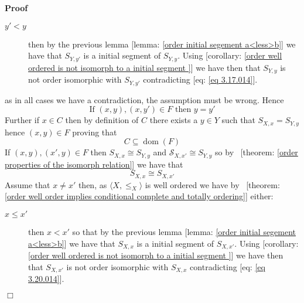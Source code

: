 \documentclass{book}
\newcommand{\tmop}[1]{\ensuremath{\operatorname{#1}}}
\newenvironment{proof}{\noindent\textbf{Proof\ }}{\hspace*{\fill}$\Box$\medskip}
\begin{document}
\begin{proof}
\begin{description}
    \item[$y' < y$] then by the previous lemma [lemma: \ref{order initial
    segement a<less>b}] we have that $S_{Y, y'}$ is a initial segment of
    $S_{Y, y}$. Using [corollary: \ref{order well ordered is not isomorph to a
    initial segment }] we have then that $S_{Y, y}$ is not order isomorphic
    with $S_{Y, y'}$ contradicting [eq: \ref{eq 3.17.014}].
  \end{description}
  as in all cases we have a contradiction, the assumption must be wrong. Hence
  \begin{equation}
    \label{eq 3.18.014} \text{If } (x, y), (x, y') \in F \text{ then } y = y'
  \end{equation}
  Further if $x \in C$ then by definition of $C$ there exists a $y \in Y$ such
  that $S_{X, x} = S_{Y, y}$ hence $(x, y) \in F$ proving that
  \begin{equation}
    \label{eq 3.19.014} C \subseteq \tmop{dom} (F)
  \end{equation}
  If $(x, y), (x', y) \in F$ then $S_{X, x} \cong S_{Y, y}$ and
  $\mathcal{S}_{X, x'} \cong S_{Y, y}$ so by \ [theorem: \ref{order properties
  of the isomorph relation}] we have that
  \begin{equation}
    \label{eq 3.20.014} S_{X, x} \cong S_{X, x'}
  \end{equation}
  Assume that $x \neq x'$ then, as $\langle X, \leqslant_X \rangle$ is well
  ordered we have by \ [theorem: \ref{order well order implies conditional
  complete and totally ordering}] either:
  \begin{description}
    \item[$x \leqslant x'$] then $x < x'$ so that by the previous lemma
    [lemma: \ref{order initial segement a<less>b}] we have that $S_{X, x}$ is
    a initial segment of $S_{X, x'}$. Using [corollary: \ref{order well
    ordered is not isomorph to a initial segment }] we have then that $S_{X,
    x'}$ is not order isomorphic with $S_{X, x}$ contradicting [eq: \ref{eq
    3.20.014}].
    

\end{description}
\end{proof}
\end{document}
